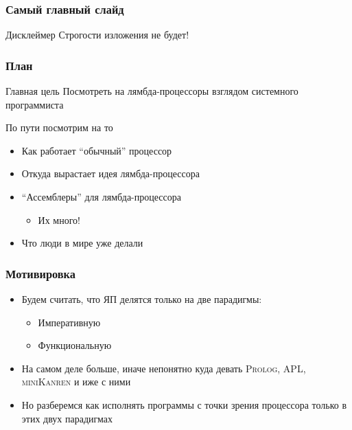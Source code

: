 \begin{frame}
    \frametitle{Самый главный слайд}

    \begin{alertblock}{Дисклеймер}
        Строгости изложения не будет!
    \end{alertblock}

\end{frame}

\begin{frame}
    \frametitle{План}

    \begin{block}{Главная цель}
        Посмотреть на лямбда-процессоры взглядом системного программиста
    \end{block}

    По пути посмотрим на то
    \begin{itemize}
        \item Как работает \enquote{обычный} процессор
        \item Откуда вырастает идея лямбда-процессора
        \item \enquote{Ассемблеры} для лямбда-процессора
              \begin{itemize}
                  \item Их много!
              \end{itemize}
        \item Что люди в мире уже делали
    \end{itemize}

\end{frame}

\begin{frame}
    \frametitle{Мотивировка}
    \begin{itemize}
        \item Будем считать, что ЯП делятся только на две парадигмы:
              \begin{itemize}
                  \item Императивную
                  \item Функциональную
              \end{itemize}
        \item На самом деле больше, иначе непонятно куда девать \textsc{Prolog, APL, miniKanren} и иже с ними
        \item Но разберемся как исполнять программы с точки зрения процессора только в этих двух парадигмах
    \end{itemize}
\end{frame}

